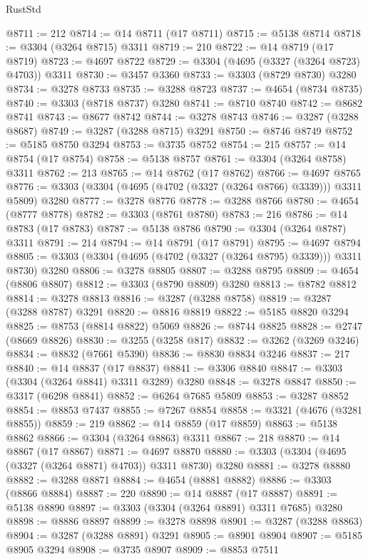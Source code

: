 \begin{lexlean}{RustStd}
\begin{coremodule}
{\begin{coremodule}
{{{{{{{{{{{{{{{{{{{{{{{{{{{{{{{{{@8711 := 212
@8714 := @14 @8711 (@17 @8711)
@8715 := @5138 @8714
@8718 := @3304 (@3264 @8715) @3311
@8719 := 210
@8722 := @14 @8719 (@17 @8719)
@8723 := @4697 @8722
@8729 := @3304 (@4695 (@3327 (@3264 @8723) @4703)) @3311
@8730 := @3457 @3360
@8733 := @3303 (@8729 @8730) @3280
@8734 := @3278 @8733
@8735 := @3288 @8723
@8737 := @4654 (@8734 @8735)
@8740 := @3303 (@8718 @8737) @3280
@8741 := @8710 @8740
@8742 := @8682 @8741
@8743 := @8677 @8742
@8744 := @3278 @8743
@8746 := @3287 (@3288 @8687)
@8749 := @3287 (@3288 @8715) @3291
@8750 := @8746 @8749
@8752 := @5185 @8750 @3294
@8753 := @3735 @8752
@8754 := 215
@8757 := @14 @8754 (@17 @8754)
@8758 := @5138 @8757
@8761 := @3304 (@3264 @8758) @3311
@8762 := 213
@8765 := @14 @8762 (@17 @8762)
@8766 := @4697 @8765
@8776 := @3303 (@3304 (@4695 (@4702 (@3327 (@3264 @8766) @3339))) @3311 @5809) @3280
@8777 := @3278 @8776
@8778 := @3288 @8766
@8780 := @4654 (@8777 @8778)
@8782 := @3303 (@8761 @8780)
@8783 := 216
@8786 := @14 @8783 (@17 @8783)
@8787 := @5138 @8786
@8790 := @3304 (@3264 @8787) @3311
@8791 := 214
@8794 := @14 @8791 (@17 @8791)
@8795 := @4697 @8794
@8805 := @3303 (@3304 (@4695 (@4702 (@3327 (@3264 @8795) @3339))) @3311 @8730) @3280
@8806 := @3278 @8805
@8807 := @3288 @8795
@8809 := @4654 (@8806 @8807)
@8812 := @3303 (@8790 @8809) @3280
@8813 := @8782 @8812
@8814 := @3278 @8813
@8816 := @3287 (@3288 @8758)
@8819 := @3287 (@3288 @8787) @3291
@8820 := @8816 @8819
@8822 := @5185 @8820 @3294
@8825 := @8753 (@8814 @8822) @5069
@8826 := @8744 @8825
@8828 := @2747 (@8669 @8826)
@8830 := @3255 (@3258 @817)
@8832 := @3262 (@3269 @3246)
@8834 := @8832 (@7661 @5390)
@8836 := @8830 @8834 @3246
@8837 := 217
@8840 := @14 @8837 (@17 @8837)
@8841 := @3306 @8840
@8847 := @3303 (@3304 (@3264 @8841) @3311 @3289) @3280
@8848 := @3278 @8847
@8850 := @3317 (@6298 @8841)
@8852 := @6264 @7685 @5809
@8853 := @3287 @8852
@8854 := @8853 @7437
@8855 := @7267 @8854
@8858 := @3321 (@4676 (@3281 @8855))
@8859 := 219
@8862 := @14 @8859 (@17 @8859)
@8863 := @5138 @8862
@8866 := @3304 (@3264 @8863) @3311
@8867 := 218
@8870 := @14 @8867 (@17 @8867)
@8871 := @4697 @8870
@8880 := @3303 (@3304 (@4695 (@3327 (@3264 @8871) @4703)) @3311 @8730) @3280
@8881 := @3278 @8880
@8882 := @3288 @8871
@8884 := @4654 (@8881 @8882)
@8886 := @3303 (@8866 @8884)
@8887 := 220
@8890 := @14 @8887 (@17 @8887)
@8891 := @5138 @8890
@8897 := @3303 (@3304 (@3264 @8891) @3311 @7685) @3280
@8898 := @8886 @8897
@8899 := @3278 @8898
@8901 := @3287 (@3288 @8863)
@8904 := @3287 (@3288 @8891) @3291
@8905 := @8901 @8904
@8907 := @5185 @8905 @3294
@8908 := @3735 @8907
@8909 := @8853 @7511
}}}}}}}}}}}}}}}}}}}}}}}}}}}}}}}}}
\end{coremodule}}
\end{coremodule}
\end{lexlean}
